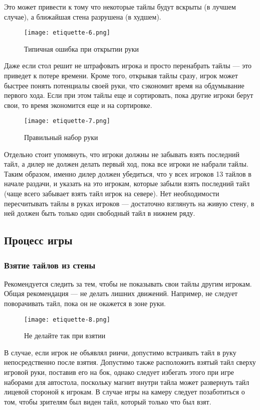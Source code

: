 Это может привести к тому что некоторые тайлы будут вскрыты (в лучшем случае), а ближайшая стена разрушена (в худшем).

\begin{figure}[H]
	\centering
	\texttt{[image: etiquette-6.png]}
	\caption{Типичная ошибка при открытии руки}
\end{figure}

Даже если стол решит не штрафовать игрока и просто перенабрать тайлы --- это приведет к потере времени. Кроме того, открывая тайлы сразу, игрок может быстрее понять потенциалы своей руки, что сэкономит время на обдумывание первого хода. Если при этом тайлы еще и сортировать, пока другие игроки берут свои, то время экономится еще и на сортировке.

\begin{figure}[H]
	\centering
	\texttt{[image: etiquette-7.png]}
	\caption{Правильный набор руки}
\end{figure}

Отдельно стоит упомянуть, что игроки должны не забывать взять последний тайл, а дилер не должен делать первый ход, пока все игроки не набрали тайлы. Таким образом, именно дилер должен убедиться, что у всех игроков 13 тайлов в начале раздачи, и указать на это игрокам, которые забыли взять последний тайл (чаще всего забывает взять тайл игрок на севере). Нет необходимости пересчитывать тайлы в руках игроков --- достаточно взглянуть на живую стену, в ней должен быть только один свободный тайл в нижнем ряду. 

\subsection{Процесс игры}

\subsubsection{Взятие тайлов из стены}

Рекомендуется следить за тем, чтобы не показывать свои тайлы другим игрокам. Общая рекомендация --- не делать лишних движений. Например, не следует поворачивать тайл, пока он не окажется в зоне руки.

\begin{figure}[H]
	\centering
	\texttt{[image: etiquette-8.png]}
	\caption{Не делайте так при взятии}
\end{figure}

В случае, если игрок не объявлял риичи, допустимо встраивать тайл в руку непосредственно после взятия. Допустимо также расположить взятый тайл сверху игровой руки, поставив его на бок, однако следует избегать этого при игре наборами для автостола, поскольку магнит внутри тайла может развернуть тайл лицевой стороной к игрокам. В случае игры на камеру следует позаботиться о том, чтобы зрителям был виден тайл, который только что был взят.

